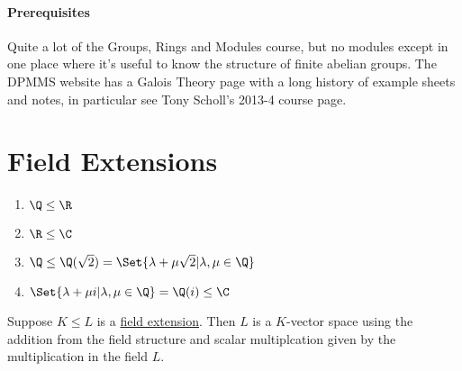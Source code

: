 \documentclass{article}
\begin{document}

\paragraph{Prerequisites} Quite a lot of the Groups, Rings and Modules course, but no modules except in one place where it's useful to know the structure of finite abelian groups.
The DPMMS website has a Galois Theory page with a long history of example sheets and notes, in particular see Tony Scholl's 2013-4 course page.
\clearpage

\section{Field Extensions}\label{sec:1}

\begin{eg}
    \leavevmode
    \begin{enumerate}[label=(\roman*)]
        \item $\Q \leq \R$
        \item $\R \leq \C$
        \item $\Q \leq \Q(\sqrt{2}) = \Set{\lambda + \mu \sqrt{2} | \lambda, \mu \in \Q}$
        \item $\Set{\lambda + \mu i | \lambda, \mu \in \Q} = \Q(i) \leq \C$
    \end{enumerate}
\end{eg}

Suppose $K \leq L$ is a \hyperlink{def:fieldExt}{field extension}. Then $L$ is a $K$-vector space using the addition from the field structure and scalar multiplcation given by the multiplication in the field $L$.

\end{document}
